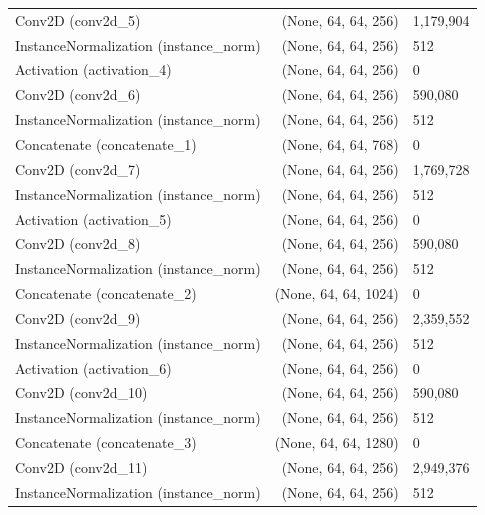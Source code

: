\documentclass[12pt,DIV14,BCOR12mm,a4paper,footinclude=false,headinclude,parskip=half-,twoside,openright,cleardoublepage=empty,toc=index,bibliography=totoc,listof=totoc]{scrreprt}
\numberwithin{equation}{chapter}
\begin{document}
\begin{longtable}{lrl}
		Conv2D (conv2d\_5)                   & (None, 64, 64, 256)         & 1,179,904        \\
		InstanceNormalization (instance\_norm) & (None, 64, 64, 256)         & 512              \\
		Activation (activation\_4)            & (None, 64, 64, 256)         & 0                \\
		Conv2D (conv2d\_6)                   & (None, 64, 64, 256)         & 590,080          \\
		InstanceNormalization (instance\_norm) & (None, 64, 64, 256)         & 512              \\
		Concatenate (concatenate\_1)          & (None, 64, 64, 768)         & 0                \\
		Conv2D (conv2d\_7)                   & (None, 64, 64, 256)         & 1,769,728        \\
		InstanceNormalization (instance\_norm) & (None, 64, 64, 256)         & 512              \\
		Activation (activation\_5)            & (None, 64, 64, 256)         & 0                \\
		Conv2D (conv2d\_8)                   & (None, 64, 64, 256)         & 590,080          \\
		InstanceNormalization (instance\_norm) & (None, 64, 64, 256)         & 512              \\
		Concatenate (concatenate\_2)          & (None, 64, 64, 1024)        & 0                \\
		Conv2D (conv2d\_9)                   & (None, 64, 64, 256)         & 2,359,552        \\
		InstanceNormalization (instance\_norm) & (None, 64, 64, 256)         & 512              \\
		Activation (activation\_6)            & (None, 64, 64, 256)         & 0                \\
		Conv2D (conv2d\_10)                  & (None, 64, 64, 256)         & 590,080          \\
		InstanceNormalization (instance\_norm) & (None, 64, 64, 256)         & 512              \\
		Concatenate (concatenate\_3)          & (None, 64, 64, 1280)        & 0                \\
		Conv2D (conv2d\_11)                  & (None, 64, 64, 256)         & 2,949,376        \\
		InstanceNormalization (instance\_norm) & (None, 64, 64, 256)         & 512              \\

\end{longtable}
\end{document}
